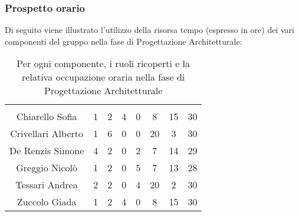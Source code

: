 \subsubsection{Prospetto orario}
Di seguito viene illustrato l'utilizzo della risorsa tempo (espresso in ore) dei vari componenti del gruppo nella fase di Progettazione Architetturale:

\begin{table}[H]
	\begin{center}
		\begin{tabular}{c
				!{\color[HTML]{9b240a}\vrule width 1pt}
				cccccc
				!{\color[HTML]{9b240a}\vrule width 1pt}	
				c}
			\rowcolorhead
			 &  &  &  &  &  &  &  \\
			
			Chiarello Sofia & 1 & 2 & 4 & 0 & 8 & 15 & 30\\
			Crivellari Alberto & 1 & 6 & 0 & 0 & 20 & 3 & 30\\
			De Renzis Simone & 4 & 2 & 0 & 2 & 7 & 14 & 29\\
			Greggio Nicolò & 1 & 2 & 0 & 5 & 7 & 13 & 28\\
			Tessari Andrea & 2 & 2 & 0 & 4 & 20 & 2 & 30\\
			Zuccolo Giada & 1 & 2 & 4 & 0 & 8 & 15 & 30\\
		\end{tabular}
		\caption[Occupazione oraria Progettazione Architetturale]{Per ogni componente, i ruoli ricoperti e la relativa occupazione oraria nella fase di Progettazione Architetturale}
	\end{center}
\end{table}


